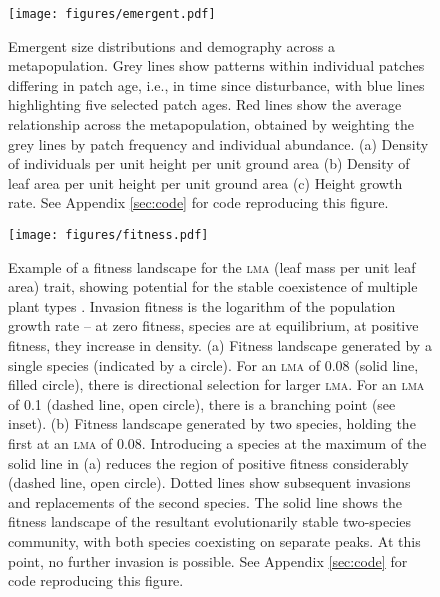 \documentclass[a4paper,11pt]{article}
\begin{document}
\newpage

\begin{figure}[h!]
\centering
\texttt{[image: figures/emergent.pdf]}
\caption{Emergent size distributions and demography across a metapopulation.
Grey lines show patterns within individual patches differing in patch age, i.e., in time
since disturbance, with blue lines highlighting five selected
patch ages. Red lines show the average relationship across the metapopulation,
obtained by weighting the grey lines by patch frequency and individual abundance.
(a) Density of individuals per unit height per unit ground area (b) Density of leaf area
per unit height per unit ground area (c) Height growth rate.
See Appendix \ref{sec:code} for code reproducing this figure.}
\label{fig:emergent}
\end{figure}

\newpage

\begin{figure}[h!]
\centering
\texttt{[image: figures/fitness.pdf]}
\caption{Example of a fitness landscape for the \textsc{lma} (leaf mass per
 unit leaf area) trait, showing potential for the stable coexistence of
 multiple plant types \citep[adapted from][]{Falster-2015}. Invasion fitness is the logarithm of the population growth rate --
 at zero fitness, species are at equilibrium, at positive fitness, they increase in
 density. (a) Fitness landscape generated by a single species (indicated by
 a circle). For an \textsc{lma} of 0.08 (solid line, filled circle), there is
 directional selection for larger \textsc{lma}. For an \textsc{lma} of
 0.1 (dashed line, open circle), there is a branching point (see inset). (b) Fitness landscape generated by two species, holding
 the first at an \textsc{lma} of 0.08. Introducing a species at the
 maximum of the solid line in (a) reduces the region of positive
 fitness considerably (dashed line, open circle). Dotted lines show
 subsequent invasions and replacements of the second species. The
 solid line shows the fitness landscape of the resultant evolutionarily stable two-species community, with both species coexisting
 on separate peaks. At this point, no further
 invasion is possible. See Appendix \ref{sec:code} for code
 reproducing this figure.}
\label{fig:fitness}
\end{figure}

\clearpage
\setcounter{secnumdepth}{1}
\end{document}
